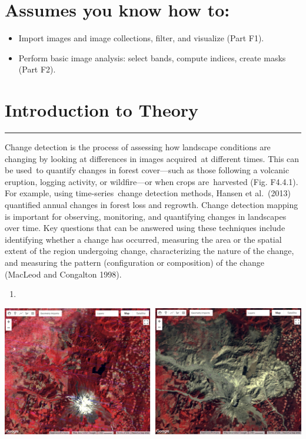 \documentclass[
  letterpaper,
  DIV=11,
  numbers=noendperiod]{scrreprt}
\providecommand{\tightlist}{%
  \setlength{\itemsep}{0pt}\setlength{\parskip}{0pt}}\usepackage{longtable,booktabs,array}
\begin{document}
\hypertarget{assumes-you-know-how-to-11}{%
\section*{Assumes you know how to:}\label{assumes-you-know-how-to-11}}


\begin{itemize}
\tightlist
\item
  Import images and image collections, filter, and visualize (Part F1).
\item
  Perform basic image analysis: select bands, compute indices, create
  masks (Part F2).
\end{itemize}

\hypertarget{introduction-to-theory-6}{%
\section*{Introduction to Theory}\label{introduction-to-theory-6}}


\begin{center}\rule{0.5\linewidth}{0.5pt}\end{center}

Change detection is the process of assessing how landscape conditions
are changing by looking at differences in images acquired~at different
times. This can be used~to quantify changes in forest cover---such as
those following a volcanic eruption, logging activity, or wildfire---or
when crops are~harvested (Fig. F4.4.1). For example, using
time-series~change detection methods, Hansen et al.~(2013) quantified
annual changes in forest loss and regrowth. Change detection mapping is
important for observing, monitoring, and quantifying changes in
landscapes over time. Key questions that can be answered using these
techniques include identifying whether a change has occurred, measuring
the area or the spatial extent of the region undergoing change,
characterizing the nature of the change, and measuring the pattern
(configuration or composition) of the change (MacLeod and Congalton
1998).

\begin{enumerate}
\def\labelenumi{\alph{enumi})}
\tightlist
\item
\end{enumerate}

\includegraphics{./F4/image80.png}
\end{document}
